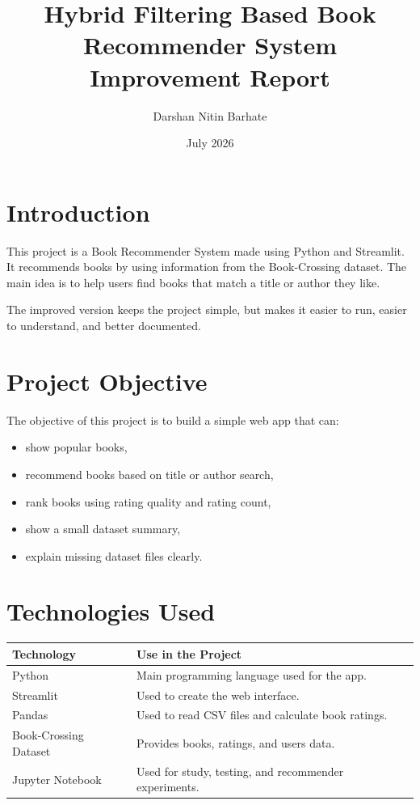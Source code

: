 \documentclass[12pt]{article}
\title{Hybrid Filtering Based Book Recommender System Improvement Report}
\author{Darshan Nitin Barhate}
\date{July 2026}
\begin{document}
\maketitle

\section{Introduction}
This project is a Book Recommender System made using Python and Streamlit. It recommends books by using information from the Book-Crossing dataset. The main idea is to help users find books that match a title or author they like.

The improved version keeps the project simple, but makes it easier to run, easier to understand, and better documented.

\section{Project Objective}
The objective of this project is to build a simple web app that can:
\begin{itemize}[leftmargin=*]
    \item show popular books,
    \item recommend books based on title or author search,
    \item rank books using rating quality and rating count,
    \item show a small dataset summary,
    \item explain missing dataset files clearly.
\end{itemize}

\section{Technologies Used}
\begin{tabular}{|>{\raggedright\arraybackslash}p{4cm}|>{\raggedright\arraybackslash}p{9cm}|}
\hline
\textbf{Technology} & \textbf{Use in the Project} \\
\hline
Python & Main programming language used for the app. \\
\hline
Streamlit & Used to create the web interface. \\
\hline
Pandas & Used to read CSV files and calculate book ratings. \\
\hline
Book-Crossing Dataset & Provides books, ratings, and users data. \\
\hline
Jupyter Notebook & Used for study, testing, and recommender experiments. \\
\hline
\end{tabular}
\end{document}
